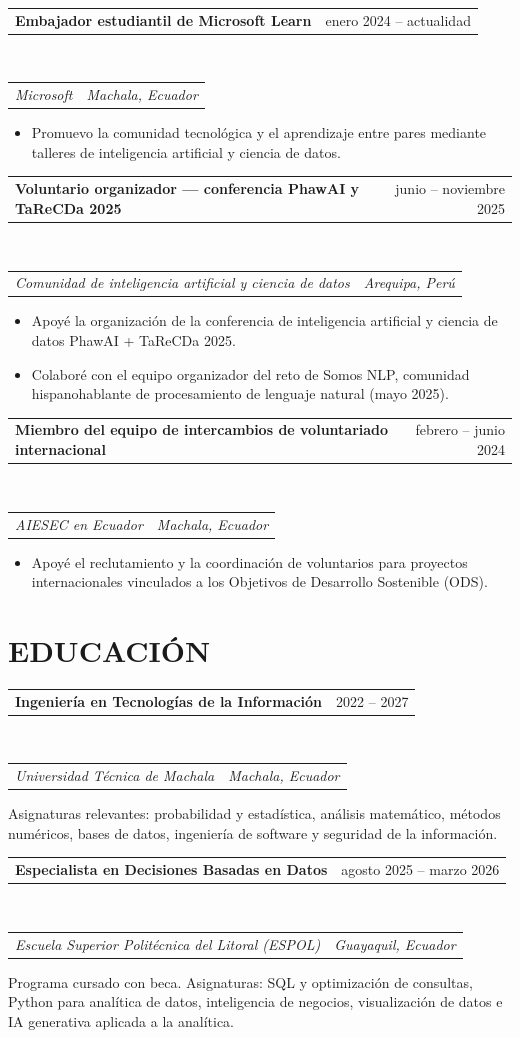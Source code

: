 \documentclass[letterpaper,10pt]{article}
\makeatletter
\newcommand{\fila}[2]{%
  \begin{tabular*}{\textwidth}{@{}l@{\extracolsep{\fill}}r@{}}
    #1 & #2 \\
  \end{tabular*}%
}
\newcommand{\entrada}[4]{%
  \fila{\textbf{#1}}{#2}\\[1pt]
  \fila{\textit{#3}}{\textit{#4}}\vspace{1pt}%
}
\newenvironment{vinetas}
  {\begin{itemize}[leftmargin=1.4em,label=$\bullet$,itemsep=0.5pt,topsep=1pt,parsep=0pt,partopsep=0pt]}
  {\end{itemize}\vspace{1pt}}
\makeatother
\begin{document}
\entrada{Embajador estudiantil de Microsoft Learn}{enero 2024 -- actualidad}
        {Microsoft}{Machala, Ecuador}
\begin{vinetas}
  \item Promuevo la comunidad tecnológica y el aprendizaje entre pares
        mediante talleres de inteligencia artificial y ciencia de datos.
\end{vinetas}

\entrada{Voluntario organizador --- conferencia PhawAI y TaReCDa 2025}{junio -- noviembre 2025}
        {Comunidad de inteligencia artificial y ciencia de datos}{Arequipa, Perú}
\begin{vinetas}
  \item Apoyé la organización de la conferencia de inteligencia artificial y
        ciencia de datos PhawAI + TaReCDa 2025.
  \item Colaboré con el equipo organizador del reto de Somos NLP, comunidad
        hispanohablante de procesamiento de lenguaje natural (mayo 2025).
\end{vinetas}

\entrada{Miembro del equipo de intercambios de voluntariado internacional}{febrero -- junio 2024}
        {AIESEC en Ecuador}{Machala, Ecuador}
\begin{vinetas}
  \item Apoyé el reclutamiento y la coordinación de voluntarios para
        proyectos internacionales vinculados a los Objetivos de Desarrollo
        Sostenible (ODS).
\end{vinetas}

\section*{EDUCACIÓN}

\entrada{Ingeniería en Tecnologías de la Información}{2022 -- 2027}
        {Universidad Técnica de Machala}{Machala, Ecuador}
Asignaturas relevantes: probabilidad y estadística, análisis matemático,
métodos numéricos, bases de datos, ingeniería de software y seguridad de la
información.
\vspace{2pt}

\entrada{Especialista en Decisiones Basadas en Datos}{agosto 2025 -- marzo 2026}
        {Escuela Superior Politécnica del Litoral (ESPOL)}{Guayaquil, Ecuador}
Programa cursado con beca. Asignaturas: SQL y optimización de consultas,
Python para analítica de datos, inteligencia de negocios, visualización de
datos e IA generativa aplicada a la analítica.
\vspace{2pt}
\end{document}
